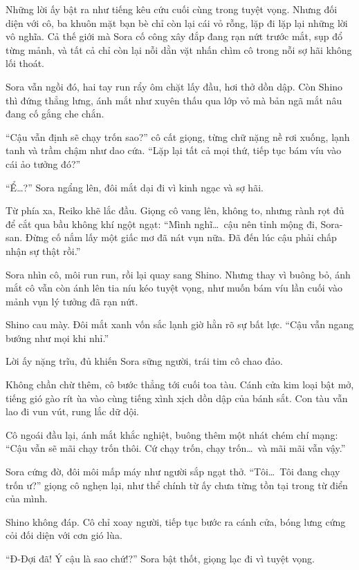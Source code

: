 \documentclass[../main.tex]{subfiles}
\begin{document}

Những lời ấy bật ra như tiếng kêu cứu cuối cùng trong tuyệt vọng. Nhưng đối diện với cô, ba khuôn mặt bạn bè chỉ còn lại cái vỏ rỗng, lặp đi lặp lại những lời vô nghĩa. Cả thế giới mà Sora cố công xây đắp đang rạn nứt trước mắt, sụp đổ từng mảnh, và tất cả chỉ còn lại nỗi dằn vặt nhấn chìm cô trong nỗi sợ hãi không lối thoát.

Sora vẫn ngồi đó, hai tay run rẩy ôm chặt lấy đầu, hơi thở dồn dập. Còn Shino thì đứng thẳng lưng, ánh mắt như xuyên thấu qua lớp vỏ mà bản ngã mắt nâu đang cố gắng che chắn.

``Cậu vẫn định sẽ chạy trốn sao?'' cô cất giọng, từng chữ nặng nề rơi xuống, lạnh tanh và trầm chậm như dao cứa. ``Lặp lại tất cả mọi thứ, tiếp tục bám víu vào cái ảo tưởng đó?''

``Ể\dots?'' Sora ngẩng lên, đôi mắt dại đi vì kinh ngạc và sợ hãi.

Từ phía xa, Reiko khẽ lắc đầu. Giọng cô vang lên, không to, nhưng rành rọt đủ để cắt qua bầu không khí ngột ngạt: ``Mình nghĩ\dots\ cậu nên tỉnh mộng đi, Sora-san. Đừng cố nắm lấy một giấc mơ đã nát vụn nữa. Đã đến lúc cậu phải chấp nhận sự thật rồi.''

Sora nhìn cô, môi run run, rồi lại quay sang Shino. Nhưng thay vì buông bỏ, ánh mắt cô vẫn còn ánh lên tia níu kéo tuyệt vọng, như muốn bám víu lần cuối vào mảnh vụn lý tưởng đã rạn nứt.

Shino cau mày. Đôi mắt xanh vốn sắc lạnh giờ hằn rõ sự bất lực. ``Cậu vẫn ngang bướng như mọi khi nhỉ.''

Lời ấy nặng trĩu, đủ khiến Sora sững người, trái tim cô chao đảo.

Không chần chừ thêm, cô bước thẳng tới cuối toa tàu. Cánh cửa kim loại bật mở, tiếng gió gào rít ùa vào cùng tiếng xình xịch dồn dập của bánh sắt. Con tàu vẫn lao đi vun vút, rung lắc dữ dội.


Cô ngoái đầu lại, ánh mắt khắc nghiệt, buông thêm một nhát chém chí mạng: ``Cậu vẫn sẽ mãi chạy trốn thôi. Cứ chạy trốn, chạy trốn\dots\ và mãi mãi vẫn vậy.''

Sora cứng đờ, đôi môi mấp máy như người sắp ngạt thở. ``Tôi\dots\ Tôi đang chạy trốn ư?'' giọng cô nghẹn lại, như thể chính từ ấy chưa từng tồn tại trong từ điển của mình.

Shino không đáp. Cô chỉ xoay người, tiếp tục bước ra cánh cửa, bóng lưng cứng cỏi đối diện với cơn gió lùa.

``Đ-Đợi đã! Ý cậu là sao chứ!?'' Sora bật thốt, giọng lạc đi vì tuyệt vọng.
\end{document}
